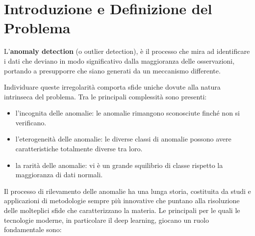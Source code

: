 \chapter{Introduzione e Definizione del Problema}

L'\textbf{anomaly detection} (o outlier detection), è il processo che mira ad identificare i dati che deviano in modo significativo dalla maggioranza delle osservazioni, portando a presupporre che siano generati da un meccanismo differente. 

Individuare queste irregolarità comporta sfide uniche dovute alla natura intrinseca del problema. Tra le principali complessità sono presenti:
\begin{itemize}
    \item l'incognita delle anomalie: le anomalie rimangono sconosciute finché non si verificano.
    \item l'eterogeneità delle anomalie: le diverse classi di anomalie possono avere caratteristiche totalmente diverse tra loro.
    \item la rarità delle anomalie: vi è un grande squilibrio di classe rispetto la maggioranza di dati normali. \cite{Pang_et_al._2021}
\end{itemize}

Il processo di rilevamento delle anomalie ha una lunga storia, costituita da studi e applicazioni di metodologie sempre più innovative che puntano alla risoluzione delle molteplici sfide che caratterizzano la materia.
Le principali per le quali le tecnologie moderne, in particolare il deep learning, giocano un ruolo fondamentale sono:

